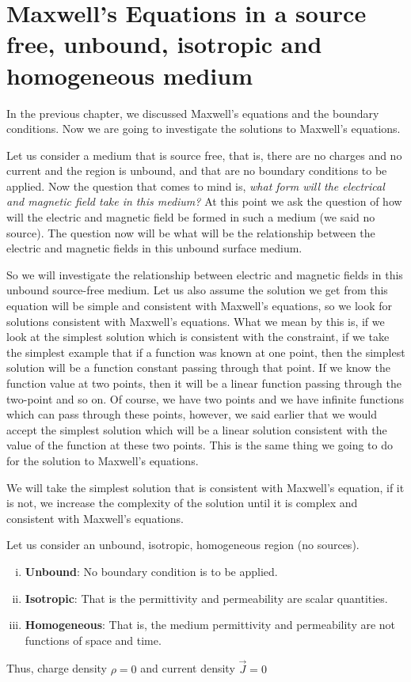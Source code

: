 \chapter{Maxwell's Equations in a source free, unbound, isotropic and homogeneous medium}\label{lec:lec21}

In the previous chapter, we discussed Maxwell's equations and the boundary conditions. Now we are going to investigate the solutions to Maxwell's equations.

Let us consider a medium that is source free, that is, there are no charges and no current and the region is unbound, and that are no boundary conditions to be applied. Now the question that comes to mind is, \emph{what form will the electrical and magnetic field take in this medium?} At this point we ask the question of how will the electric and magnetic field be formed in such a medium (we said no source). The question now will be what will be the relationship between the electric and magnetic fields in this unbound surface medium.

So we will investigate the relationship between electric and magnetic fields in this unbound source-free medium. Let us also assume the solution we get from this equation will be simple and consistent with Maxwell's equations, so we look for solutions consistent with Maxwell's equations. What we mean by this is, if we look at the simplest solution which is consistent with the constraint, if we take the simplest example that if a function was known at one point, then the simplest solution will be a function constant passing through that point. If we know the function value at two points, then it will be a linear function passing through the two-point and so on. Of course, we have two points and we have infinite functions which can pass through these points, however, we said earlier that we would accept the simplest solution which will be a linear solution consistent with the value of the function at these two points. This is the same thing we going to do for the solution to Maxwell's equations. 

We will take the simplest solution that is consistent with Maxwell's equation, if it is not, we increase the complexity of the solution until it is complex and consistent with Maxwell's equations.

Let us consider an unbound, isotropic, homogeneous region (no sources).
\begin{enumerate}[(i)]
\item \textbf{Unbound}: No boundary condition is to be applied.
\item \textbf{Isotropic}: That is the permittivity and permeability are scalar quantities.
\item \textbf{Homogeneous}: That is, the medium permittivity and permeability are not functions of space and time. 
\end{enumerate}
Thus, charge density $\rho=0$ and current density $\vec{J}=0$

